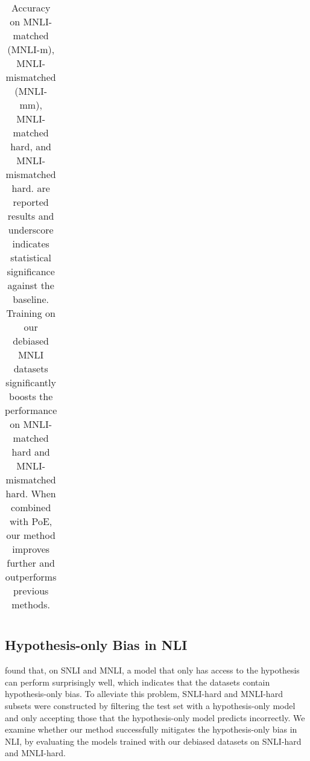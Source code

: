 \begin{table*}[bt]
\begin{center}
{\begin{tabular}{lllllllll}
      \bottomrule
    \end{tabular}
}
\caption{Accuracy on MNLI-matched (MNLI-m), MNLI-mismatched (MNLI-mm), MNLI-matched hard, and MNLI-mismatched hard.  are reported results and underscore indicates statistical significance against the baseline.
Training on our debiased MNLI datasets significantly boosts the performance on MNLI-matched hard and MNLI-mismatched hard. When combined with PoE, our method improves further and outperforms previous methods.
} \label{tab:mnli-results}
\end{center}
\end{table*}



\subsection{Hypothesis-only Bias in NLI} \label{sec:nli-hard}

\citet{GururanganSLSBS18} found that, on SNLI and MNLI, a model that only has access to the hypothesis can perform surprisingly well, which indicates that the datasets contain hypothesis-only bias.
To alleviate this problem, SNLI-hard and MNLI-hard~\citep{GururanganSLSBS18} subsets were constructed by filtering the test set with a hypothesis-only model and only accepting those that the hypothesis-only model predicts incorrectly.
We examine whether our method successfully mitigates the hypothesis-only bias in NLI, by evaluating the models trained with our debiased datasets on SNLI-hard and MNLI-hard.


